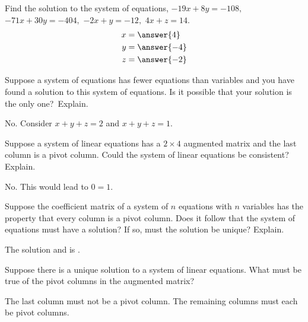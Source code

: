 \documentclass{ximera}
\begin{document}
\begin{problem}\label{prb:2.38} Find the solution to the system of equations, $-19x+8y=-108,$
$-71x+30y=-404,$ $-2x+y=-12,$ $4x+z=14.$
 \begin{align*}
 x&=\answer{4}\\
 y&=\answer{-4}\\
 z&=\answer{-2}\\
 \end{align*}
\end{problem}

\begin{problem}\label{prb:2.39} Suppose a system of equations has fewer equations than variables and
you have found a solution to this system of equations. Is it possible that
your solution is the only one?\ Explain.
\begin{hint}
No. Consider $x+y+z=2$ and $x+y+z=1.$
\end{hint}
\end{problem}

\begin{problem}\label{prb:2.40} Suppose a system of linear equations has a $2\times 4$ augmented
matrix and the last column is a pivot column. Could the system of linear
equations be consistent? Explain.
\begin{hint}
 No. This would lead to $0=1.$
\end{hint}
\end{problem}

\begin{problem}\label{prb:2.41} Suppose the coefficient matrix of a system of $n$ equations with $n$
variables has the property that every column is a pivot column. Does it
follow that the system of equations must have a solution? If so, must the
solution be unique? Explain.

The solution  and is .
\end{problem}

\begin{problem}\label{prb:2.42} Suppose there is a unique solution to a system of linear equations.
What must be true of the pivot columns in the augmented matrix?
\begin{hint}
The last column must not be a pivot column. The remaining columns must each be pivot
columns.
\end{hint}
\end{problem}
\end{document}
